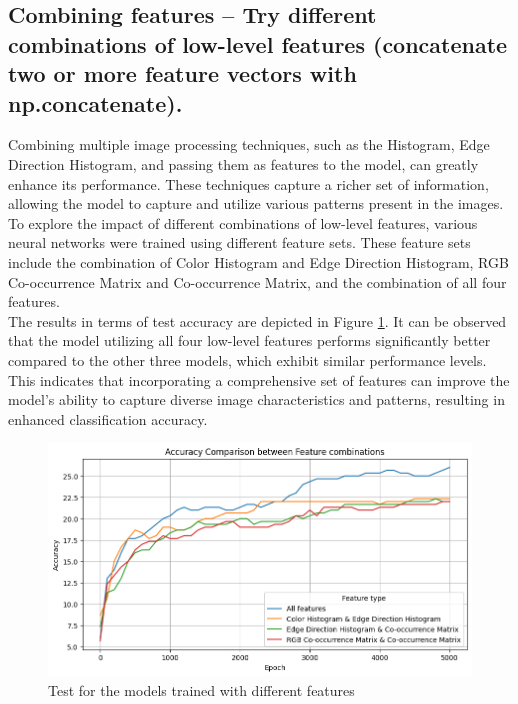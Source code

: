 \documentclass{class}
\begin{document}
\subsection{Combining features -- Try different combinations of low-level features (concatenate two or more feature vectors
    with np.concatenate).}
Combining multiple image processing techniques, such as the Histogram, Edge Direction Histogram, and passing them as features to the model,
can greatly enhance its performance. These techniques capture a richer set of information,
allowing the model to capture and utilize various patterns present in the images.\\
To explore the impact of different combinations of low-level features, various neural networks were trained using different feature sets.
These feature sets include the combination of Color Histogram and Edge Direction Histogram, RGB Co-occurrence Matrix and Co-occurrence Matrix,
and the combination of all four features.\\
The results in terms of test accuracy are depicted in Figure \ref{fig-3}.
It can be observed that the model utilizing all four low-level features performs significantly better compared to the other three models,
which exhibit similar performance levels.\\
This indicates that incorporating a comprehensive set of features can improve the model's ability to capture diverse image characteristics and patterns,
resulting in enhanced classification accuracy.
\begin{figure}[h]
    \centering
    \includegraphics[width=.8\columnwidth]{images/2.1_diff_features.png}
    \caption{Test for the models trained with different features}
    \label{fig-3}
\end{figure}
\end{document}
